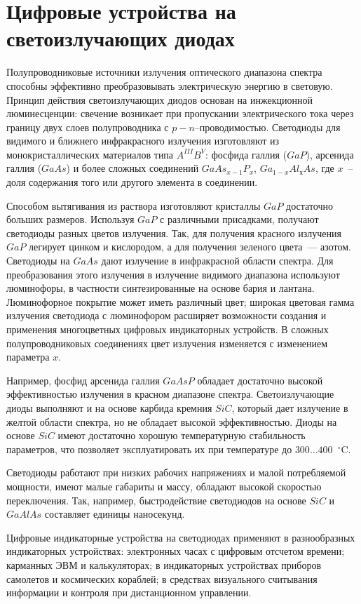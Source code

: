 \section{Цифровые устройства на светоизлучающих диодах}

Полупроводниковые источники излучения оптического диапазона спектра способны эффективно преобразовывать электрическую энергию в световую. Принцип действия светоизлучающих диодов основан на инжекционной люминесценции: свечение возникает при пропускании электрического тока через границу двух слоев полупроводника с $ p-n $--проводимостью. Светодиоды для видимого и ближнего инфракрасного излучения изготовляют из монокристаллических материалов типа $ A^{III}B^{V} $: фосфида галлия ($ GaP $), арсенида галлия ($ GaAs $) и более сложных соединений $ GaAs_{x-1}P_x $, $ Ga_{1-x}Al_{х}As $, где $ x $~-- доля содержания того или другого элемента в соединении.

Способом вытягивания из раствора изготовляют кристаллы $ GaP $ достаточно больших размеров. Используя $ GaP $ с различными присадками, получают светодиоды разных цветов излучения. Так, для получения красного излучения $ GaP $ легирует цинком и кислородом, а для получения зеленого цвета~--- азотом. Светодиоды на $ GaAs $ дают излучение в инфракрасной области спектра. Для преобразования этого излучения в излучение видимого диапазона используют люминофоры, в частности синтезированные на основе бария и лантана. Люминофорное покрытие может иметь различный цвет; широкая цветовая гамма излучения светодиода с люминофором расширяет возможности создания и применения многоцветных цифровых индикаторных устройств. В сложных полупроводниковых соединениях цвет излучения изменяется с изменением параметра $ x $. 

Например, фосфид арсенида галлия $ GaAsP $ обладает достаточно высокой эффективностью излучения в красном диапазоне спектра. Светоизлучающие диоды выполняют и на основе карбида кремния $ SiC $, который дает излучение в желтой области спектра, но не обладает высокой эффективностью. Диоды на основе $ SiC $ имеют достаточно хорошую температурную стабильность параметров, что позволяет эксплуатировать их при температуре до $ 300\ldots 400$~$ ^\circ $C. 

Светодиоды работают при низких рабочих напряжениях и малой потребляемой мощности, имеют малые габариты и массу, обладают высокой скоростью переключения. Так, например, быстродействие светодиодов на основе $ SiC $ и $ GaAlAs $ составляет единицы наносекунд. 

Цифровые индикаторные устройства на светодиодах применяют в разнообразных индикаторных устройствах: электронных часах с цифровым отсчетом времени; карманных ЭВМ и калькуляторах; в индикаторных устройствах приборов самолетов и космических кораблей; в средствах визуального считывания информации и контроля при дистанционном управлении.

